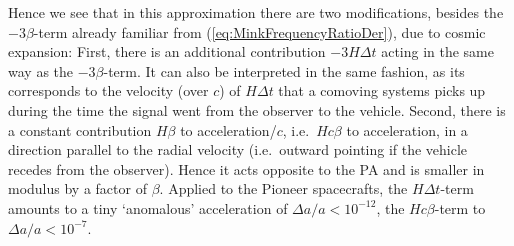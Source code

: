 \documentclass
[rmp,aps,twocolumn,showpacs,preprintnumbers,amsmath,amssymb]{revtex4}
\theoremstyle{plain}
\theoremstyle{definition}
\theoremstyle{remark}
\begin{document}
%
Hence we see that in this approximation there are two 
modifications, besides the $-3\beta$-term already familiar 
from (\ref{eq:MinkFrequencyRatioDer}), due to cosmic 
expansion: First, there is an additional contribution 
$-3H\Delta t$ acting in the same way as the $-3\beta$-term. 
It can also be interpreted in the same fashion, as its 
corresponds to the velocity (over $c$) of $H\Delta t$ 
that a comoving systems picks up during the time the 
signal went from the observer to the vehicle. 
Second, there is a constant contribution $H\beta$ to 
acceleration/$c$, i.e.~$Hc\beta$ to acceleration, in
a direction parallel to the radial velocity (i.e.~outward 
pointing if the vehicle recedes from the observer). 
Hence it acts opposite to the PA and is smaller in modulus 
by a factor of $\beta$. Applied to the Pioneer spacecrafts, 
the $H\Delta t$-term amounts to a tiny `anomalous' 
acceleration of $\Delta a/a <10^{-12}$, the $Hc\beta$-term 
to $\Delta a/a <10^{-7}$.
\end{document}
